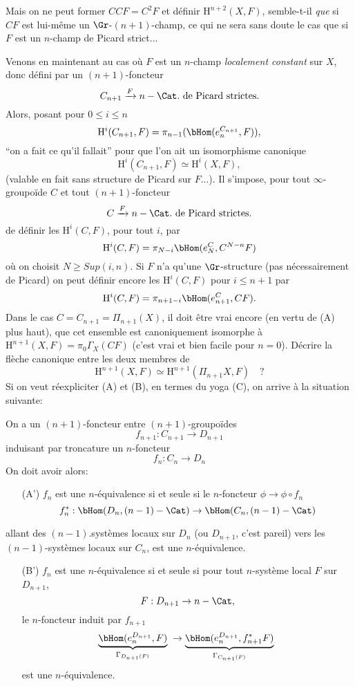 Mais on ne peut former $CCF = C^2F$ et définir $\mathrm H^{n+2}(X, F)$, semble-t-il \emph{que} si $CF$ est lui-même un $\Gr$-$(n+1)$-champ, ce qui ne sera sans doute le cas que si $F$ est un $n$-champ de Picard strict...

Venons en maintenant au cas où $F$ est un $n$-champ \emph{localement constant} sur $X$, donc défini par un $(n+1)$-foncteur
$$
C_{n+1} \xrightarrow{F} n-\Cat.~\text{de Picard strictes}.
$$
Alors, posant pour $0 \leq i \leq n$
$$
\mathrm H^i(C_ {n+1}, F) = \pi_{n-1}(\bHom(e_n^{C_{n+1}}, F)),
$$
``on a fait ce qu'il fallait'' pour que l'on ait un isomorphisme canonique
$$
\mathrm H^i(C_{n+1}, F) \simeq \mathrm H^i(X, F),
$$
(valable en fait sans structure de Picard sur $F$...). Il s'impose, pour tout $\infty$-groupoïde $C$ et tout $(n+1)$-foncteur
$$
C \xrightarrow{F} n-\Cat.~\text{de Picard strictes}.
$$
de définir les $\mathrm H^i(C, F)$, pour tout $i$, par
$$
\mathrm H^i(C, F) = \pi_{N-i}\bHom(e_N^C, C^{N-n}F)
$$
où on choisit $N \geq Sup (i, n)$. Si $F$ n'a qu'une $\Gr$-structure (pas nécessairement de Picard) on peut définir encore les $\mathrm H^i(C, F)$ pour $i \leq n+1$ par
$$
\mathrm H^i(C, F) = \pi_{n+1-i}\bHom(e_{n+1}^C, CF).
$$
Dans le cas $C = C_{n+1} = \Pi_{n+1}(X)$, il doit être vrai encore (en vertu de (A) plus haut), que cet ensemble est canoniquement isomorphe à $\mathrm H^{n+1}(X, F) = \pi_0 \Gamma_X(CF)$ (c'est vrai et bien facile pour $n = 0$). Décrire la flèche canonique entre les deux membres de 
$$
\mathrm H^{n+1}(X, F) \simeq \mathrm H^{n+1}(\Pi_{n+1}X, F) \quad ?
$$
Si on veut réexpliciter (A) et (B), en termes du yoga (C), on arrive à la situation suivante:

On a un $(n+1)$-foncteur entre $(n+1)$-groupoïdes
$$
f_{n+1}: C_{n+1} \to D_{n+1}
$$
induisant par troncature un $n$-foncteur
$$
f_n: C_n \to D_n
$$
On doit avoir alors:
\begin{enumerate}
    \item[(A')] $f_n$ est une $n$-équivalence si et seule si le $n$-foncteur $\phi \to \phi \circ f_n$
    $$
    f_n^*: \bHom(D_n, (n-1)-\Cat) \to \bHom(C_n, (n-1)-\Cat)
    $$
\end{enumerate}
allant des $(n-1)$.systèmes locaux sur $D_n$ (ou $D_{n+1}$, c'est pareil) vers les $(n-1)$-systèmes locaux sur $C_n$, est une $n$-équivalence.
\begin{enumerate}
    \item[(B')] $f_n$ est une $n$-équivalence si et seule si pour tout $n$-système local $F$ sur $D_{n+1}$,
    $$
    F: D_{n+1} \to n-\Cat,
    $$
    le $n$-foncteur induit par $f_{n+1}$
    $$
    \underbrace{\bHom(e_n^{D_{n+1}}, F)}_{\hspace*{-5mm}\Gamma_{D_{n+1}(F)}\hspace*{-5mm}}\; \to \underbrace{\bHom(e_n^{D_{n+1}}, f^*_{n+1} F)}_{\hspace*{-5mm}\Gamma_{C_{n+1}(F)}\hspace*{-5mm}}\;
    $$
    est une $n$-équivalence.
\end{enumerate}

